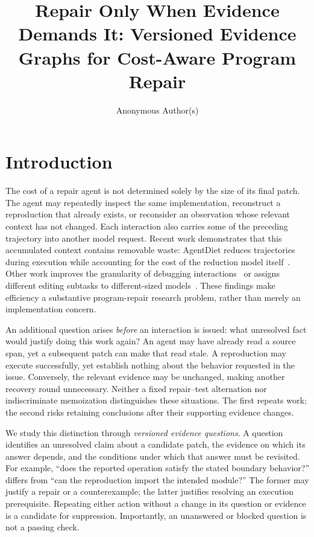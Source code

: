 \documentclass[acmsmall,screen,review,anonymous]{acmart}
\title[Evidence-Driven Repair]{Repair Only When Evidence Demands It: Versioned Evidence Graphs for Cost-Aware Program Repair}
\author{Anonymous Author(s)}
\begin{document}
\maketitle

\section{Introduction}
The cost of a repair agent is not determined solely by the size of its final patch. The agent may repeatedly inspect the same implementation, reconstruct a reproduction that already exists, or reconsider an observation whose relevant context has not changed. Each interaction also carries some of the preceding trajectory into another model request. Recent work demonstrates that this accumulated context contains removable waste: AgentDiet reduces trajectories during execution while accounting for the cost of the reduction model itself~\cite{xiao2026agentdiet}. Other work improves the granularity of debugging interactions~\cite{xiang2026adi} or assigns different editing subtasks to different-sized models~\cite{wang2026cascade}. These findings make efficiency a substantive program-repair research problem, rather than merely an implementation concern.

An additional question arises \emph{before} an interaction is issued: what unresolved fact would justify doing this work again? An agent may have already read a source span, yet a subsequent patch can make that read stale. A reproduction may execute successfully, yet establish nothing about the behavior requested in the issue. Conversely, the relevant evidence may be unchanged, making another recovery round unnecessary. Neither a fixed repair--test alternation nor indiscriminate memoization distinguishes these situations. The first repeats work; the second risks retaining conclusions after their supporting evidence changes.

We study this distinction through \emph{versioned evidence questions}. A question identifies an unresolved claim about a candidate patch, the evidence on which its answer depends, and the conditions under which that answer must be revisited. For example, ``does the reported operation satisfy the stated boundary behavior?'' differs from ``can the reproduction import the intended module?'' The former may justify a repair or a counterexample; the latter justifies resolving an execution prerequisite. Repeating either action without a change in its question or evidence is a candidate for suppression. Importantly, an unanswered or blocked question is not a passing check.
\end{document}
